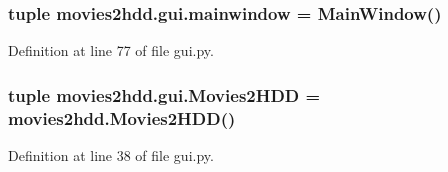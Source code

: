 \hypertarget{namespacemovies2hdd_1_1gui_ab66ae08952e6997fa86b05e376de756a}{
\subsubsection[{mainwindow}]{\setlength{\rightskip}{0pt plus 5cm}tuple movies2hdd.\-gui.\-mainwindow = {\bf Main\-Window}()}}\label{namespacemovies2hdd_1_1gui_ab66ae08952e6997fa86b05e376de756a}


Definition at line 77 of file gui.\-py.

\hypertarget{namespacemovies2hdd_1_1gui_a47850301e02e470855a027b38dd4b229}{
\subsubsection[{Movies2\-H\-D\-D}]{\setlength{\rightskip}{0pt plus 5cm}tuple movies2hdd.\-gui.\-Movies2\-H\-D\-D = {\bf movies2hdd.\-Movies2\-H\-D\-D}()}}\label{namespacemovies2hdd_1_1gui_a47850301e02e470855a027b38dd4b229}


Definition at line 38 of file gui.\-py.

